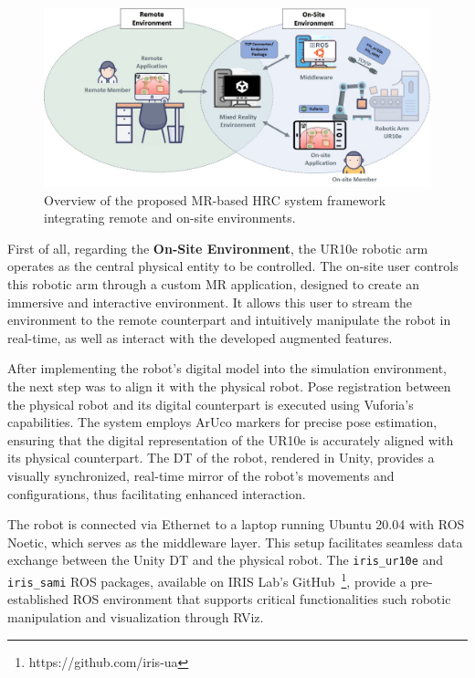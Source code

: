 \begin{figure}[h]
    \centering
    \includegraphics[width=\linewidth]{figs/framework-1.jpeg}
    \caption{Overview of the proposed \ac{MR}-based \ac{HRC} system framework integrating remote and on-site environments.}
    \label{fig:project_framework}
\end{figure}

First of all, regarding the \textbf{On-Site Environment}, the UR10e robotic arm operates as the central physical entity to be controlled. The on-site user controls this robotic arm through a custom \ac{MR} application, designed to create an immersive and interactive environment. It allows this user to stream the environment to the remote counterpart and intuitively manipulate the robot in real-time, as well as interact with the developed augmented features.  

After implementing the robot's digital model into the simulation environment, the next step was to align it with the physical robot. Pose registration between the physical robot and its digital counterpart is executed using Vuforia's capabilities. The system employs ArUco markers for precise pose estimation, ensuring that the digital representation of the UR10e is accurately aligned with its physical counterpart. The \ac{DT} of the robot, rendered in Unity, provides a visually synchronized, real-time mirror of the robot's movements and configurations, thus facilitating enhanced interaction.

The robot is connected via Ethernet to a laptop running Ubuntu 20.04 with \ac{ROS} Noetic, which serves as the middleware layer. This setup facilitates seamless data exchange between the Unity \ac{DT} and the physical robot. The \texttt{iris\_ur10e} and \texttt{iris\_sami} \ac{ROS} packages, available on IRIS Lab's GitHub~\footnote{https://github.com/iris-ua}, provide a pre-established \ac{ROS} environment that supports critical functionalities such robotic manipulation and visualization through RViz.

